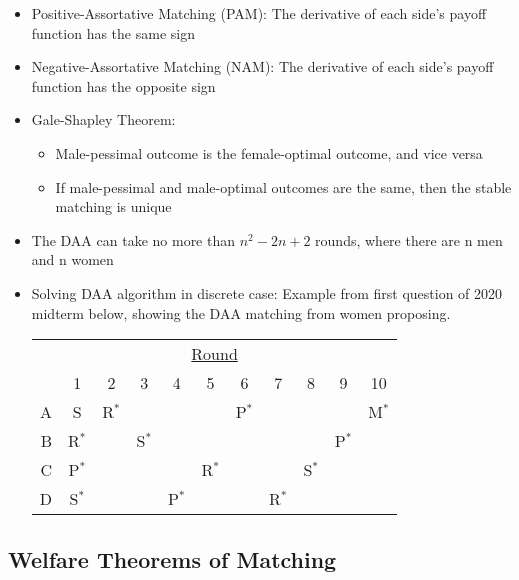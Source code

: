 \documentclass{article}
\begin{document}
\begin{itemize}
	\item Positive-Assortative Matching (PAM): The derivative of each side’s payoff function has the same sign
	
	\item Negative-Assortative Matching (NAM): The derivative of each side’s payoff function has the opposite sign
	
	\item Gale-Shapley Theorem:
	
	\begin{itemize}
		
		\item Male-pessimal outcome is the female-optimal outcome, and vice versa
		
		\item If male-pessimal and male-optimal outcomes are the same, then the stable matching is unique
	
	\end{itemize}
	
	\item The DAA can take no more than $n^2-2n+2$ rounds, where there are n men and n women
	
	\item Solving DAA algorithm in discrete case: Example from first question of 2020 midterm below, showing the DAA matching from women proposing.
		\begin{center}
			\begin{tabular}{r|c|c|c|c|c|c|c|c|c|c}
			\multicolumn{11}{c}{\underline{Round}} \\ 
			 	& 1 		& 2 		& 3 		& 4 		& 5 		& 6		& 7 		& 8 		& 9 		& 10	\\\hline
			  A 	& S 		& R$^*$	& 		& 		&		& P$^*$	&		&		&		& M$^*$ \\\hline
			  B 	& R$^*$ 	& 		& S$^*$	& 		&		&		&		&		& P$^*$	& \\\hline
			  C 	& P$^*$ 	& 		& 		& 		& R$^*$ 	&		&		& S$^*$	&		& \\\hline
			  D	& S$^*$	& 		& 		& P$^*$	&		&		& R$^*$ 	&		&		& \\\hline
			\end{tabular}
		\end{center}
	
	
\end{itemize}



\subsection{Welfare Theorems of Matching}
\end{document}
